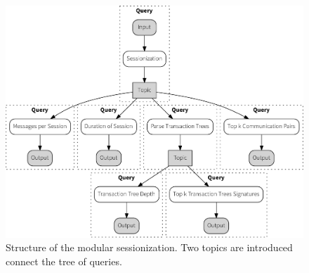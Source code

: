 \begin{figure}[p]
  \centering
    \includegraphics[width=1\textwidth]{figures/sessionize_split-crop}
  \caption[Dataflow graph for modular sessionization]{Structure of the modular
  sessionization. Two topics are introduced connect the tree of queries.}
  \label{fig:split}
\end{figure}
